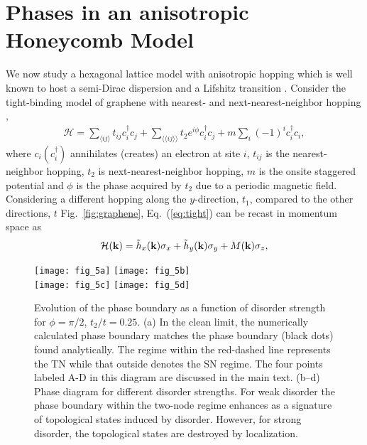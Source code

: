 \documentclass[aps,prb,showpacs,twocolumn,floats]{revtex4-1}
\begin{document}
\section{Phases in an anisotropic Honeycomb Model}
We now study a hexagonal lattice model with anisotropic hopping which is well known to host a semi-Dirac dispersion and a Lifshitz transition \cite{montam}. Consider the tight-binding model of graphene with nearest- and next-nearest-neighbor hopping \cite{haldane} ,
\begin{align}
\mathcal{H} = \sum_{\langle ij\rangle}t_{ij}c_{i}^{\dagger}c_j+\sum_{\langle\langle ij\rangle\rangle}t_2 e^{i\phi}c_{i}^{\dagger}c_{j} 
+m \sum_{i} (-1)^i c_{i}^{\dagger}c_{i},
\label{eq:tight}
\end{align}
where $c_i (c_i^{\dagger})$ annihilates (creates) an electron at site $i$, $t_{ij}$ is the nearest-neighbor hopping, $t_2$ is next-nearest-neighbor hopping, $m$ is the onsite staggered potential and $\phi$ is the phase acquired by $t_2$ due to a periodic magnetic field. Considering a different hopping along the $y$-direction, $t_1$, compared to the other directions, $t$ Fig.~\ref{fig:graphene}, Eq.~(\ref{eq:tight}) can be recast in momentum space as   
\begin{align}
\mathcal {H}({\bf k})=\tilde h_x({\bf k} )\sigma_x+\tilde h_y({\bf k})\sigma_y+M({\bf k})\sigma_z,
\end{align}
 \begin{figure}
\texttt{[image: fig\_5a]}
\texttt{[image: fig\_5b]}\\
\texttt{[image: fig\_5c]}
\texttt{[image: fig\_5d]}
\caption{Evolution of the phase boundary as a function of disorder strength for $\phi = \pi/2$, $t_2/t = 0.25$. (a) In the clean limit, the numerically calculated phase boundary matches the phase boundary (black dots) found analytically.  The regime within the red-dashed line represents the TN while that outside denotes the SN regime. The four points labeled A-D in this diagram are discussed in the main text. (b--d) Phase diagram for different disorder strengths. For weak disorder the phase boundary within the two-node regime enhances as a signature of topological states induced by disorder. However, for strong disorder, the topological states are destroyed by localization.}
\label{fig:disorder}
\end{figure}
\end{document}

